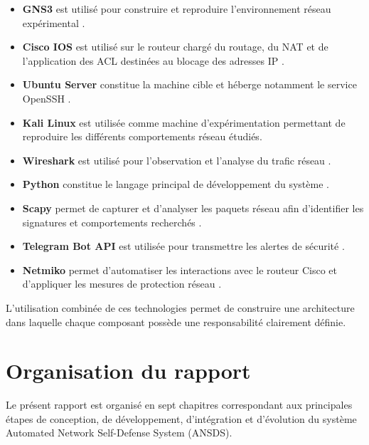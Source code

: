 \begin{itemize}
    \item \textbf{GNS3} est utilisé pour construire et reproduire l’environnement
    réseau expérimental \cite{gns3_docs}.

    \item \textbf{Cisco IOS} est utilisé sur le routeur chargé du routage,
    du NAT et de l’application des ACL destinées au blocage des adresses IP \cite{cisco_ios}.

    \item \textbf{Ubuntu Server} constitue la machine cible et héberge
    notamment le service OpenSSH \cite{rfc4253}.

    \item \textbf{Kali Linux} est utilisée comme machine d’expérimentation
    permettant de reproduire les différents comportements réseau étudiés.

    \item \textbf{Wireshark} est utilisé pour l’observation et l’analyse
    du trafic réseau \cite{wireshark_docs}.

    \item \textbf{Python} constitue le langage principal de développement
    du système \cite{python_docs}.

    \item \textbf{Scapy} permet de capturer et d’analyser les paquets réseau
    afin d’identifier les signatures et comportements recherchés \cite{scapy_docs}.

    \item \textbf{Telegram Bot API} est utilisée pour transmettre les alertes
    de sécurité \cite{telegram_bot_api}.

    \item \textbf{Netmiko} permet d’automatiser les interactions avec le
    routeur Cisco et d’appliquer les mesures de protection réseau \cite{netmiko_docs}.
\end{itemize}

L’utilisation combinée de ces technologies permet de construire une
architecture dans laquelle chaque composant possède une responsabilité
clairement définie.

\section{Organisation du rapport}

Le présent rapport est organisé en sept chapitres correspondant aux principales étapes de conception, de développement, d'intégration et d'évolution du système Automated Network Self-Defense System (ANSDS).

